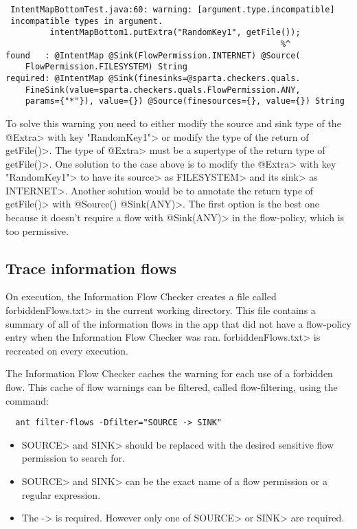 \begin{Verbatim}
 IntentMapBottomTest.java:60: warning: [argument.type.incompatible] 
 incompatible types in argument.
         intentMapBottom1.putExtra("RandomKey1", getFile());
                                                        %^
found   : @IntentMap @Sink(FlowPermission.INTERNET) @Source(
    FlowPermission.FILESYSTEM) String
required: @IntentMap @Sink(finesinks=@sparta.checkers.quals.
    FineSink(value=sparta.checkers.quals.FlowPermission.ANY, 
    params={"*"}), value={}) @Source(finesources={}, value={}) String
\end{Verbatim}

To solve this warning you need to either modify the source and sink type of the
\<@Extra> with key \<"RandomKey1"> or modify the type of the return of
\<getFile()>. The type of \<@Extra> must be a supertype of the return type of
\<getFile()>. One solution to the case above is to modify the \<@Extra> with
key \<"RandomKey1"> to have its \<source> as \<FILESYSTEM> and its \<sink> as
\<INTERNET>. Another solution would be to annotate the return type of
\<getFile()> with \<@Source({}) @Sink(ANY)>. The first option is the best one
because it doesn't require a flow with \<@Sink(ANY)> in the flow-policy, which
is too permissive.


\subsection{Trace information flows\label{sec:trace-types}}

On execution, the Information Flow Checker creates a file called \<forbiddenFlows.txt> in the current
working directory. This file contains a summary of all of the information flows
in the app that did not have a flow-policy entry when the Information Flow Checker was ran.
\<forbiddenFlows.txt> is recreated on every execution.

The Information Flow Checker caches the warning for each use of a forbidden flow.
This cache of flow warnings can be filtered, called flow-filtering, using the command:

\begin{Verbatim}
  ant filter-flows -Dfilter="SOURCE -> SINK"
\end{Verbatim}

\begin{itemize}

\item \<SOURCE> and \<SINK> should be replaced with the desired sensitive flow
permission to search for.

\item \<SOURCE> and \<SINK> can be the exact name of a flow permission or a regular
expression.

\item The -> is required. However only one of \<SOURCE> or \<SINK> are required.
\end{itemize}

